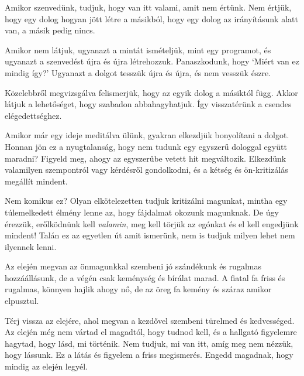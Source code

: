 
Amikor szenvedünk, tudjuk, hogy van itt valami, amit nem értünk. Nem
értjük, hogy egy dolog hogyan jött létre a másikból, hogy egy dolog az
irányításunk alatt van, a másik pedig nincs.

Amikor nem látjuk, ugyanazt a mintát ismételjük, mint egy programot, és
ugyanazt a szenvedést újra és újra létrehozzuk. Panaszkodunk, hogy
`Miért van ez mindig így?' Ugyanazt a dolgot tesszük újra és újra, és
nem vesszük észre.

Közelebbről megvizsgálva felismerjük, hogy az egyik dolog a másiktól
függ. Akkor látjuk a lehetőséget, hogy szabadon abbahagyhatjuk. Így
visszatérünk a csendes elégedettséghez.

\clearpage


Amikor már egy ideje meditálva ülünk, gyakran elkezdjük bonyolítani a
dolgot. Honnan jön ez a nyugtalanság, hogy nem tudunk egy egyszerű
dologgal együtt maradni? Figyeld meg, ahogy az egyszerűbe vetett hit
megváltozik. Elkezdünk valamilyen szempontról vagy kérdésről
gondolkodni, és a kétség és ön-kritizálás megállít mindent.

Nem komikus ez? Olyan elkötelezetten tudjuk kritizálni magunkat, mintha
egy túlemelkedett élmény lenne az, hogy fájdalmat okozunk magunknak. De
úgy érezzük, erőlködnünk kell \emph{valamin}, meg kell törjük az egónkat
és el kell engedjünk mindent! Talán ez az egyetlen út amit ismerünk, nem
is tudjuk milyen lehet nem ilyennek lenni.

Az elején megvan az önmagunkkal szembeni jó szándékunk és rugalmas
hozzáállásunk, de a végén csak keménység és bírálat marad. A fiatal fa
friss és rugalmas, könnyen hajlik ahogy nő, de az öreg fa kemény és
száraz amikor elpusztul.

Térj vissza az elejére, ahol megvan a kezdővel szembeni türelmed és
kedvességed. Az elején még nem vártad el magadtól, hogy tudnod kell, és
a hallgató figyelemre hagytad, hogy lásd, mi történik. Nem tudjuk, mi
van itt, amíg meg nem nézzük, hogy lássunk. Ez a látás és figyelem a
friss megismerés. Engedd magadnak, hogy mindig az elején legyél.
